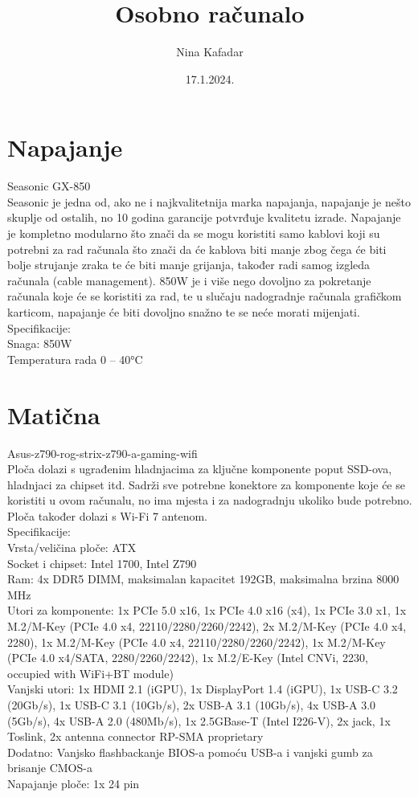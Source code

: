 \documentclass{report}
\begin{document}
\title{Osobno računalo}
\author{Nina Kafadar}
\date{17.1.2024.}
\maketitle
\tableofcontents
\listoffigures

 
\chapter{Napajanje}
Seasonic GX-850
\\ Seasonic je jedna od, ako ne i najkvalitetnija marka napajanja, napajanje je nešto skuplje od ostalih, no 10 godina garancije potvrđuje kvalitetu izrade. Napajanje je kompletno modularno što znači da se mogu koristiti samo kablovi koji su potrebni za rad računala što znači da će kablova biti manje zbog čega će biti bolje strujanje zraka te će biti manje grijanja, također radi samog izgleda računala (cable management). 850W je i više nego dovoljno za pokretanje računala koje će se koristiti za rad, te u slučaju nadogradnje računala grafičkom karticom, napajanje će biti dovoljno snažno te se neće morati mijenjati.
\\Specifikacije: 
\\Snaga: 850W
\\Temperatura rada 0 – 40°C



\chapter{Matična}
Asus-z790-rog-strix-z790-a-gaming-wifi
\\ Ploča dolazi s ugrađenim hladnjacima za ključne komponente poput SSD-ova, hladnjaci za chipset itd. Sadrži sve potrebne konektore za komponente koje će se koristiti u ovom računalu, no ima mjesta i za nadogradnju ukoliko bude potrebno. Ploča također dolazi s Wi-Fi 7 antenom.
\\Specifikacije:
\\Vrsta/veličina ploče: ATX
\\Socket i chipset: Intel 1700, Intel Z790
\\Ram: 4x DDR5 DIMM, maksimalan kapacitet 192GB, maksimalna brzina 8000 MHz
\\Utori za komponente: 1x PCIe 5.0 x16, 1x PCIe 4.0 x16 (x4), 1x PCIe 3.0 x1, 1x M.2/M-Key (PCIe 4.0 x4, 22110/2280/2260/2242), 2x M.2/M-Key (PCIe 4.0 x4, 2280), 1x M.2/M-Key (PCIe 4.0 x4, 22110/2280/2260/2242), 1x M.2/M-Key (PCIe 4.0 x4/SATA, 2280/2260/2242), 1x M.2/E-Key (Intel CNVi, 2230, occupied with WiFi+BT module)
\\Vanjski utori: 1x HDMI 2.1 (iGPU), 1x DisplayPort 1.4 (iGPU), 1x USB-C 3.2 (20Gb/s), 1x USB-C 3.1 (10Gb/s), 2x USB-A 3.1 (10Gb/s), 4x USB-A 3.0 (5Gb/s), 4x USB-A 2.0 (480Mb/s), 1x 2.5GBase-T (Intel I226-V), 2x jack, 1x Toslink, 2x antenna connector RP-SMA proprietary
\\Dodatno: Vanjsko flashbackanje BIOS-a  pomoću USB-a i vanjski gumb za brisanje CMOS-a
\\Napajanje ploče: 1x 24 pin
\end{document}
